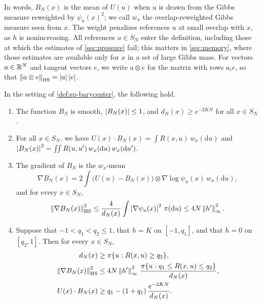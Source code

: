 In words, $B_N(x)$ is the mean of $U(u)$ when $u$ is drawn from the Gibbs measure reweighted by $\psi_u(x)^2$; we call $w_x$ the overlap-reweighted Gibbs measure seen from $x$. The weight penalizes references $u$ at small overlap with $x$, as $h$ is nonincreasing. All references $u\in S_N$ enter the definition, including those at which the estimates of \cref{sec:pressure} fail; this matters in \cref{sec:memory}, where those estimates are available only for $x$ in a set of large Gibbs mass. For vectors $a\in\mathbb R^N$ and tangent vectors $e$, we write $a\otimes e$ for the matrix with rows $a_ie$, so that $\left\lVert a\otimes e\right\rVert_{\rm HS}=\left|a\right|\left|e\right|$.

\begin{lemma}\label{lem:sp-barycenter}
In the setting of \cref{def:sp-barycenter}, the following hold.
\begin{enumerate}
\item The function $B_N$ is smooth, $\left|B_N(x)\right|\le1$, and $d_N(x)\ge e^{-2KN}$ for all $x\in S_N$.
\item For all $x\in S_N$, we have $U(x)\cdot B_N(x)=\int R(x,u)\,w_x(\mathrm du)$ and $\left|B_N(x)\right|^2=\iint R(u,u')\,w_x(\mathrm du)\,w_x(\mathrm du')$.
\item The gradient of $B_N$ is the $w_x$-mean
\begin{equation}\label{eq:sp-bary-identity}
\nabla B_N(x)=2\int\big(U(u)-B_N(x)\big)\otimes\nabla\log\psi_u(x)\,w_x(\mathrm du),
\end{equation}
and for every $x\in S_N$,
\begin{equation}\label{eq:sp-bary-gradient}
\left\lVert\nabla B_N(x)\right\rVert_{\rm HS}^2\le\frac4{d_N(x)}\int\left|\nabla\psi_u(x)\right|^2\,\pi(\mathrm du)\le4N\left\lVert h'\right\rVert_\infty^2.
\end{equation}
\item Suppose that $-1<q_1<q_2\le1$, that $h=K$ on $[-1,q_1]$, and that $h=0$ on $[q_2,1]$. Then for every $x\in S_N$,
\begin{align}
d_N(x)&\ge\pi\{u:R(x,u)\ge q_2\},\label{eq:sp-bary-denominator}\\
\left\lVert\nabla B_N(x)\right\rVert_{\rm HS}^2&\le4N\left\lVert h'\right\rVert_\infty^2\,\frac{\pi\{u:q_1\le R(x,u)\le q_2\}}{d_N(x)},\label{eq:sp-bary-collar}\\
U(x)\cdot B_N(x)&\ge q_1-(1+q_1)\,\frac{e^{-2KN}}{d_N(x)}.\label{eq:sp-bary-align}
\end{align}
\end{enumerate}
\end{lemma}

